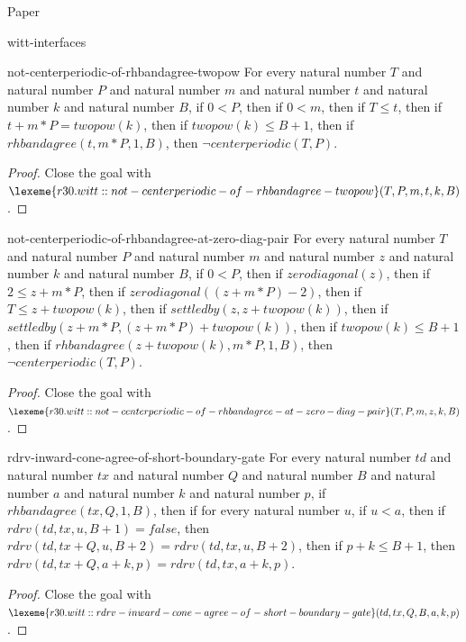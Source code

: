 \begin{lexlean}{Paper}
\begin{section}{witt-interfaces}
  \begin{theorem}{not-centerperiodic-of-rhbandagree-twopow}
  For every natural number \(T\) and natural number \(P\) and natural number \(m\) and natural number \(t\) and natural number \(k\) and natural number \(B\), if \(0 < P\), then if \(0 < m\), then if \(T ≤ t\), then if \(t + m * P = twopow(k)\), then if \(twopow(k) ≤ B + 1\), then if \(rhbandagree(t, m * P, 1, B)\), then \(¬ centerperiodic(T, P)\).
  \begin{proof}
  Close the goal with \(\lexeme{r30.witt::not-centerperiodic-of-rhbandagree-twopow}(T, P, m, t, k, B)\).
  \end{proof}
  \end{theorem}

  \begin{theorem}{not-centerperiodic-of-rhbandagree-at-zero-diag-pair}
  For every natural number \(T\) and natural number \(P\) and natural number \(m\) and natural number \(z\) and natural number \(k\) and natural number \(B\), if \(0 < P\), then if \(zerodiagonal(z)\), then if \(2 ≤ z + m * P\), then if \(zerodiagonal((z + m * P) - 2)\), then if \(T ≤ z + twopow(k)\), then if \(settledby(z, z + twopow(k))\), then if \(settledby(z + m * P, (z + m * P) + twopow(k))\), then if \(twopow(k) ≤ B + 1\), then if \(rhbandagree(z + twopow(k), m * P, 1, B)\), then \(¬ centerperiodic(T, P)\).
  \begin{proof}
  Close the goal with \(\lexeme{r30.witt::not-centerperiodic-of-rhbandagree-at-zero-diag-pair}(T, P, m, z, k, B)\).
  \end{proof}
  \end{theorem}

  \begin{theorem}{rdrv-inward-cone-agree-of-short-boundary-gate}
  For every natural number \(td\) and natural number \(tx\) and natural number \(Q\) and natural number \(B\) and natural number \(a\) and natural number \(k\) and natural number \(p\), if \(rhbandagree(tx, Q, 1, B)\), then if for every natural number \(u\), if \(u < a\), then if \(rdrv(td, tx, u, B + 1) = false\), then \(rdrv(td, tx + Q, u, B + 2) = rdrv(td, tx, u, B + 2)\), then if \(p + k ≤ B + 1\), then \(rdrv(td, tx + Q, a + k, p) = rdrv(td, tx, a + k, p)\).
  \begin{proof}
  Close the goal with \(\lexeme{r30.witt::rdrv-inward-cone-agree-of-short-boundary-gate}(td, tx, Q, B, a, k, p)\).
  \end{proof}
  \end{theorem}


\end{section}
\end{lexlean}

